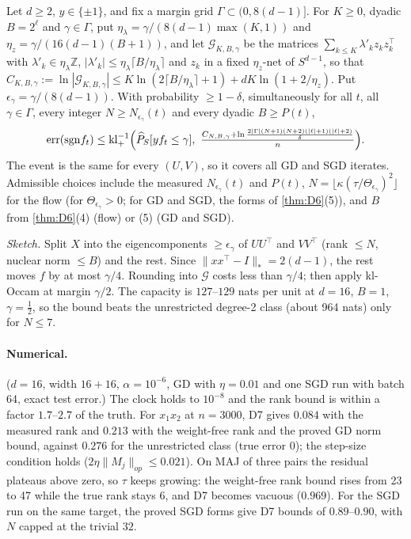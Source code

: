 \begin{theorem}[Theorem D7]\label{thm:D7}
Let $d\ge2$, $y\in\{\pm1\}$, and fix a margin grid $\Gamma\subset(0,8(d-1)]$. For $K\ge0$, dyadic $B=2^\ell$ and $\gamma\in\Gamma$, put $\eta_\lambda=\gamma/(8(d-1)\max(K,1))$ and $\eta_z=\gamma/(16(d-1)(B+1))$, and let $\mathcal G_{K,B,\gamma}$ be the matrices $\sum_{k\le K}\lambda'_kz_kz_k^\top$ with $\lambda'_k\in\eta_\lambda\mathbb Z$, $|\lambda'_k|\le\eta_\lambda\lceil B/\eta_\lambda\rceil$ and $z_k$ in a fixed $\eta_z$-net of $S^{d-1}$, so that $C_{K,B,\gamma}:=\ln|\mathcal G_{K,B,\gamma}|\le K\ln(2\lceil B/\eta_\lambda\rceil+1)+dK\ln(1+2/\eta_z)$. Put $\epsilon_\gamma=\gamma/(8(d-1))$. With probability $\ge1-\delta$, simultaneously for all $t$, all $\gamma\in\Gamma$, every integer $N\ge N_{\epsilon_\gamma}(t)$ and every dyadic $B\ge P(t)$,
\[
\mathrm{err}(\mathrm{sgn}f_t)\le\mathrm{kl}^{-1}_+\Bigl(\widehat P_S[yf_t\le\gamma],\ \tfrac{C_{N,B,\gamma}+\ln\frac{2|\Gamma|(N+1)(N+2)(|\ell|+1)(|\ell|+2)}\delta}n\Bigr).
\]
The event is the same for every $(U,V)$, so it covers all GD and SGD iterates. Admissible choices include the measured $N_{\epsilon_\gamma}(t)$ and $P(t)$, $N=\lfloor\kappa(\tau/\Theta_{\epsilon_\gamma})^2\rfloor$ for the flow (for $\Theta_{\epsilon_\gamma}>0$; for GD and SGD, the forms of \cref{thm:D6}(5)), and $B$ from \cref{thm:D6}(4) (flow) or (5) (GD and SGD).
\end{theorem}
\noindent\emph{Sketch.} Split $X$ into the eigencomponents $\ge\epsilon_\gamma$ of $UU^\top$ and $VV^\top$ (rank $\le N$, nuclear norm $\le B$) and the rest. Since $\|xx^\top-I\|_*=2(d-1)$, the rest moves $f$ by at most $\gamma/4$. Rounding into $\mathcal G$ costs less than $\gamma/4$; then apply kl-Occam at margin $\gamma/2$. The capacity is $127$--$129$ nats per unit at $d=16$, $B=1$, $\gamma=\frac12$, so the bound beats the unrestricted degree-2 class (about 964 nats) only for $N\le7$.

\paragraph{Numerical.} ($d=16$, width $16+16$, $\alpha=10^{-6}$, GD with $\eta=0.01$ and one SGD run with batch 64, exact test error.) The clock holds to $10^{-8}$ and the rank bound is within a factor $1.7$--$2.7$ of the truth. For $x_1x_2$ at $n=3000$, D7 gives $0.084$ with the measured rank and $0.213$ with the weight-free rank and the proved GD norm bound, against $0.276$ for the unrestricted class (true error $0$); the step-size condition holds ($2\eta\|M_j\|_{op}\le0.021$). On MAJ of three pairs the residual plateaus above zero, so $\tau$ keeps growing: the weight-free rank bound rises from 23 to 47 while the true rank stays 6, and D7 becomes vacuous ($0.969$). For the SGD run on the same target, the proved SGD forms give D7 bounds of $0.89$--$0.90$, with $N$ capped at the trivial $32$.
